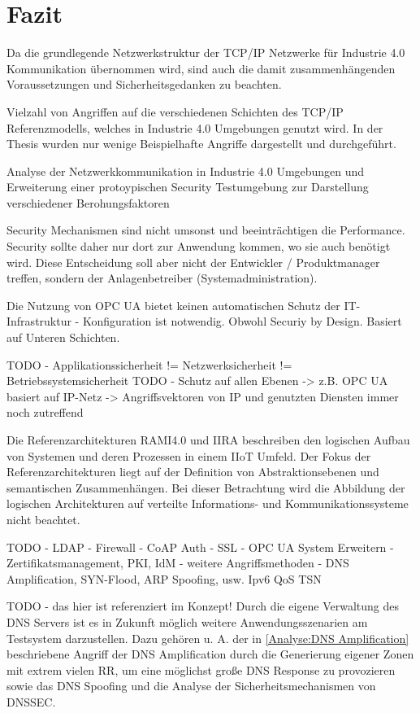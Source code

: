 \chapter{Fazit}
Da die grundlegende Netzwerkstruktur der \ac{TCP}/\ac{IP} Netzwerke für Industrie 4.0 Kommunikation übernommen wird, sind auch die damit zusammenhängenden Voraussetzungen und Sicherheitsgedanken zu beachten. \cite{sichKom2017}

Vielzahl von Angriffen auf die verschiedenen Schichten des \ac{TCP}/\ac{IP} Referenzmodells, welches in Industrie 4.0 Umgebungen genutzt wird.
In der Thesis wurden nur wenige Beispielhafte Angriffe dargestellt und durchgeführt.

Analyse der Netzwerkkommunikation in Industrie 4.0 Umgebungen und Erweiterung einer protoypischen Security Testumgebung zur Darstellung verschiedener Berohungsfaktoren

Security Mechanismen sind nicht umsonst und beeinträchtigen die Performance. Security sollte daher nur dort zur Anwendung kommen, wo sie auch benötigt wird. Diese Entscheidung soll aber nicht der Entwickler / Produktmanager treffen, sondern der Anlagenbetreiber (Systemadministration).

Die Nutzung von \ac{OPC UA} bietet keinen automatischen Schutz der IT-Infrastruktur - Konfiguration ist notwendig. Obwohl Securiy by Design. Basiert auf Unteren Schichten.

TODO - Applikationssicherheit != Netzwerksicherheit != Betriebssystemsicherheit
TODO - Schutz auf allen Ebenen -> z.B. OPC UA basiert auf IP-Netz -> Angriffsvektoren von IP und genutzten Diensten immer noch zutreffend

Die Referenzarchitekturen \ac{RAMI4.0} und \ac{IIRA} beschreiben den logischen Aufbau von Systemen und deren Prozessen in einem \ac{IIoT} Umfeld. Der Fokus der Referenzarchitekturen liegt auf der Definition von Abstraktionsebenen und semantischen Zusammenhängen. Bei dieser Betrachtung wird die Abbildung der logischen Architekturen auf verteilte Informations- und Kommunikationssysteme nicht beachtet. 

TODO -
LDAP -
Firewall -
CoAP Auth -
SSL -
OPC UA System Erweitern - Zertifikatsmanagement, PKI, IdM - 
weitere Angriffsmethoden - DNS Amplification, SYN-Flood, ARP Spoofing, usw.
Ipv6
QoS
TSN

TODO - das hier ist referenziert im Konzept!
Durch die eigene Verwaltung des \ac{DNS} Servers ist es in Zukunft möglich weitere Anwendungsszenarien am Testsystem darzustellen. Dazu gehören u. A. der in \autoref{Analyse:DNS Amplification} beschriebene Angriff der \ac{DNS} Amplification durch die Generierung eigener Zonen mit extrem vielen \ac{RR}, um eine möglichst große \ac{DNS} Response zu provozieren sowie das \ac{DNS} Spoofing und die Analyse der Sicherheitsmechanismen von \ac{DNSSEC}.

